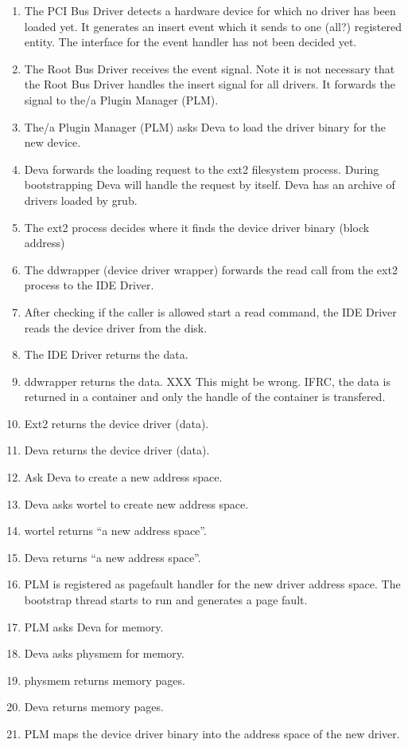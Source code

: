 \begin{enumerate}
\item The PCI Bus Driver detects a hardware device for which no driver
has been loaded yet.  It generates an insert event which it sends to
one (all?) registered entity.  The interface for the event handler has
not been decided yet.
\item The Root Bus Driver receives the event signal.  Note it is not
necessary that the Root Bus Driver handles the insert signal for all
drivers.  It forwards the signal to the/a Plugin Manager (PLM).
\item The/a Plugin Manager (PLM) asks Deva to load the driver binary
for the new device.
\item Deva forwards the loading request to the ext2 filesystem
process.  During bootstrapping Deva will handle the request by itself.
Deva has an archive of drivers loaded by grub.
\item The ext2 process decides where it finds the device driver binary
(block address)
\item The ddwrapper (device driver wrapper) forwards the read call
from the ext2 process to the IDE Driver.
\item After checking if the caller is allowed start a read command,
the IDE Driver reads the device driver from the disk.
\item The IDE Driver returns the data.
\item ddwrapper returns the data. XXX This might be wrong.  IFRC, the
data is returned in a container and only the handle of the container is
transfered.
\item Ext2 returns the device driver (data).
\item Deva returns the device driver (data).
\item Ask Deva to create a new address space.
\item Deva asks wortel to create new address space.
\item wortel returns ``a new address space''.
\item Deva returns ``a new address space''.
\item PLM is registered as pagefault handler for the new driver
address space.  The bootstrap thread starts to run and generates a
page fault.
\item PLM asks Deva for memory.
\item Deva asks physmem for memory.
\item physmem returns memory pages.
\item Deva returns memory pages.
\item PLM maps the device driver binary into the address space of the
new driver.
\end{enumerate}

